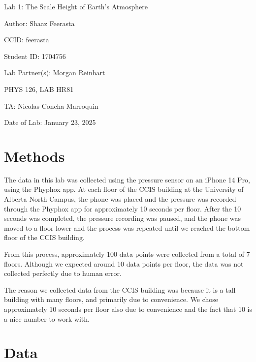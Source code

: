 \documentclass[12pt]{article}
\begin{document}
\pagebreak

\begin{titlepage}
    \begin{center}
        \vspace*{\fill}
        Lab 1: The Scale Height of Earth's Atmosphere

        Author: Shaaz Feerasta

        CCID: feerasta

        Student ID: 1704756

        Lab Partner(s): Morgan Reinhart

        PHYS 126, LAB HR81

        TA: Nicolas Concha Marroquin

        Date of Lab: January 23, 2025
        \vspace*{\fill}
    \end{center}
\end{titlepage}
\vfill

\pagebreak

\section{Methods}

The data in this lab was collected using the pressure sensor on an iPhone 14 Pro, using the Phyphox app.
At each floor of the CCIS building at the University of Alberta North Campus, the phone was placed
and the pressure was recorded through the Phyphox app for approximately 10 seconds per floor.
After the 10 seconds was completed, the pressure recording was paused, and the phone was moved to a floor lower
and the process was repeated until we reached the bottom floor of the CCIS building.

From this process, approximately 100 data points were collected from a total of 7 floors.
Although we expected around 10 data points per floor, the data was not collected perfectly due to human error.

The reason we collected data from the CCIS building was because it is a tall building with many floors,
and primarily due to convenience. We chose approximately 10 seconds per floor also due to convenience and
the fact that 10 is a nice number to work with.

\section{Data}
\end{document}
